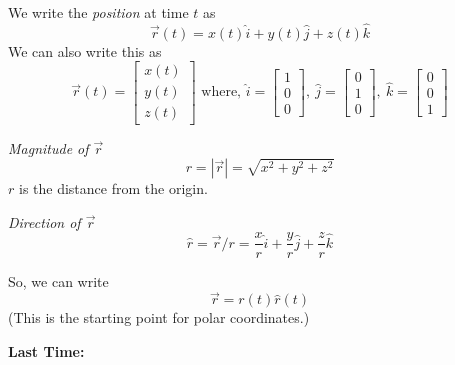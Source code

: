 \documentclass[10pt]{scrartcl}
\begin{document}
\begin{definition} We write the \emph{position} at time $t$ as
\[\vec{r}(t) = x(t)\hat{i} + y(t)\hat{j} + z(t)\hat{k}\]
We can also write this as
\[\vec{r}(t) = \left[\begin{smallmatrix}
x(t)\\ y(t) \\ z(t)	
\end{smallmatrix}
 \right]\text{ where, } \hat{i} =  \left[\begin{smallmatrix}
1\\0\\0
\end{smallmatrix}
 \right],~ \hat{j} =  \left[\begin{smallmatrix}
0\\1\\0
\end{smallmatrix}
 \right],~ \hat{k} =  \left[\begin{smallmatrix}
0\\0\\1
\end{smallmatrix}
 \right]\]
\end{definition}
\begin{definition}
 \textit{Magnitude of $\vec{r}$} \[r = |\vec{r}| = \sqrt{x^2 + y^2 + z^2}\]
$r$ is the distance from the origin.
 
 \textit{Direction of $\vec{r}$} \[\hat{r} = \vec{r}/r = \frac{x}{r}\hat{i} + \frac{y}{r}\hat{j} + \frac{z}{r}\hat{k}\]

 So, we can write 
 \[\vec{r} = r(t)\hat{r}(t)\]
 (This is the starting point for polar coordinates.)
 \end{definition}





 \textbf{Last Time:} 

\begin{center}
\end{center}
\end{document}
